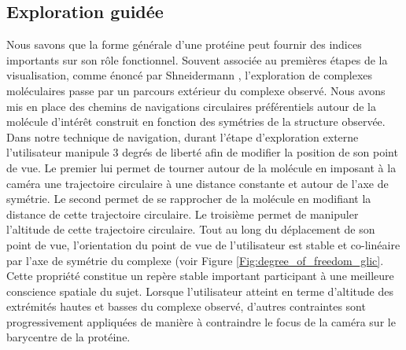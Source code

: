 
\subsection{Exploration guidée}

Nous savons que la forme générale d'une protéine peut fournir des indices importants sur son rôle fonctionnel. %
Souvent associée au premières étapes de la visualisation, comme énoncé par Shneidermann \cite{shneiderman_eyes_1996}, l'exploration de complexes moléculaires passe par un parcours extérieur du complexe observé. Nous avons mis en place des chemins de navigations circulaires préférentiels autour de la molécule d'intérêt construit en fonction des symétries de la structure observée. 
Dans notre technique de navigation, durant l'étape d'exploration externe l'utilisateur manipule 3 degrés de liberté afin de modifier la position de son point de vue. Le premier lui permet de tourner autour de la molécule en imposant à la caméra une trajectoire circulaire à une distance constante et autour de l'axe de symétrie. Le second permet de se rapprocher de la molécule en modifiant la distance de cette trajectoire circulaire. Le troisième permet de manipuler l'altitude de cette trajectoire circulaire. Tout au long du déplacement de son point de vue, l'orientation du point de vue de l'utilisateur est stable et co-linéaire par l'axe de symétrie du complexe (voir Figure \ref{Fig:degree_of_freedom_glic}. Cette propriété constitue un repère stable important participant à une meilleure conscience spatiale du sujet. Lorsque l'utilisateur atteint en terme d'altitude des extrémités hautes et basses du complexe observé, d'autres contraintes sont progressivement appliquées de manière à contraindre le focus de la caméra sur le barycentre de la protéine.

